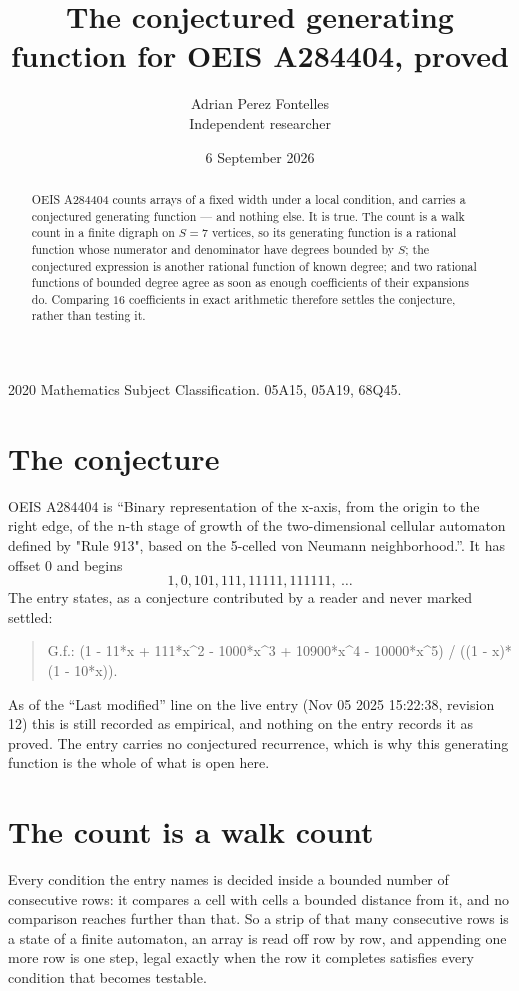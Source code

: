 \documentclass[11pt,a4paper]{article}
\title{The conjectured generating function for OEIS A284404, proved}
\author{Adrian Perez Fontelles\\ \small Independent researcher}
\date{6 September 2026}
\theoremstyle{plain}
\theoremstyle{definition}
\begin{document}
\maketitle

\begin{abstract}
OEIS A284404 counts arrays of a fixed width under a local condition, and carries a conjectured
generating function --- and nothing else. It is true. The count is a walk count in a finite
digraph on $S=7$ vertices, so its generating function is a rational function whose numerator
and denominator have degrees bounded by $S$; the conjectured expression is another rational
function of known degree; and two rational functions of bounded degree agree as soon as enough
coefficients of their expansions do. Comparing $16$ coefficients in exact arithmetic
therefore settles the conjecture, rather than testing it.
\end{abstract}

\noindent\small 2020 Mathematics Subject Classification. 05A15, 05A19, 68Q45.\normalsize

\section{The conjecture}

OEIS A284404 is ``Binary representation of the x-axis, from the origin to the right edge, of the n-th stage of growth of the two-dimensional cellular automaton defined by "Rule 913", based on the 5-celled von Neumann neighborhood.''. It has offset $0$ and begins
\[
1, 0, 101, 111, 11111, 111111,\ \dots
\]
The entry states, as a conjecture contributed by a reader and never marked settled:
\begin{quote}
G.f.: (1 - 11*x + 111*x\^{}2 - 1000*x\^{}3 + 10900*x\^{}4 - 10000*x\^{}5) / ((1 - x)*(1 - 10*x)).
\end{quote}
As of the ``Last modified'' line on the live entry (Nov 05 2025 15:22:38, revision 12) this is still
recorded as empirical, and nothing on the entry records it as proved. The entry carries no
conjectured recurrence, which is why this generating function is the whole of what is open
here.

\section{The count is a walk count}

Every condition the entry names is decided inside a bounded number of consecutive rows: it
compares a cell with cells a bounded distance from it, and no comparison reaches further than
that. So a strip of that many consecutive rows is a state of a finite automaton, an array is
read off row by row, and appending one more row is one step, legal exactly when the row it
completes satisfies every condition that becomes testable.
\end{document}
